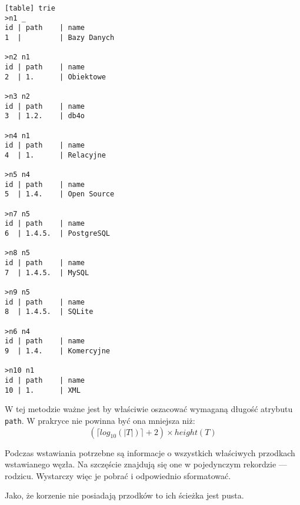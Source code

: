 
\begin{verbatim}[table] trie
>n1 _
id | path    | name
1  |         | Bazy Danych

>n2 n1
id | path    | name
2  | 1.      | Obiektowe

>n3 n2
id | path    | name
3  | 1.2.    | db4o

>n4 n1
id | path    | name
4  | 1.      | Relacyjne

>n5 n4
id | path    | name
5  | 1.4.    | Open Source

>n7 n5
id | path    | name
6  | 1.4.5.  | PostgreSQL

>n8 n5
id | path    | name
7  | 1.4.5.  | MySQL

>n9 n5
id | path    | name
8  | 1.4.5.  | SQLite

>n6 n4
id | path    | name
9  | 1.4.    | Komercyjne

>n10 n1
id | path    | name
10 | 1.      | XML

\end{verbatim}



W tej metodzie ważne jest by właściwie oszacować wymaganą długość atrybutu \texttt{path}.
W prakryce nie powinna być ona mniejsza niż:
\begin{displaymath}
    (\lceil log_{10}(|T|) \rceil + 2) \times height(T)
\end{displaymath}




Podczas wstawiania potrzebne są informacje o wszystkich właściwych przodkach wstawianego węzła.
Na szczęście znajdują się one w pojedynczym rekordzie --- rodzicu.
Wystarczy więc je pobrać i odpowiednio sformatować.



Jako, że korzenie nie posiadają przodków to ich ścieżka jest pusta. 





